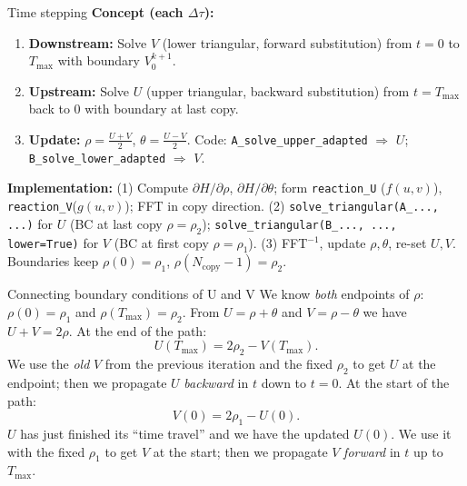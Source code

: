 \documentclass{beamer}
\begin{document}
\begin{frame}{Time stepping}
    \textbf{Concept (each $\Delta\tau$):}
    \begin{enumerate}
        \item \textbf{Downstream:} Solve $V$ (lower triangular, forward substitution) from $t=0$ to $T_{\max}$ with boundary $V_0^{k+1}$.
        \item \textbf{Upstream:} Solve $U$ (upper triangular, backward substitution) from $t=T_{\max}$ back to $0$ with boundary at last copy.
        \item \textbf{Update:} $\rho = \frac{U+V}{2}$, $\theta = \frac{U-V}{2}$. Code: \texttt{A\_solve\_upper\_adapted} $\Rightarrow$ $U$; \texttt{B\_solve\_lower\_adapted} $\Rightarrow$ $V$.
    \end{enumerate}
    \vspace{0.4em}
    \textbf{Implementation:} (1) Compute $\partial H/\partial\rho$, $\partial H/\partial\theta$; form \texttt{reaction\_U} ($f(u,v)$), \texttt{reaction\_V}($g(u,v)$); FFT in copy direction. (2) \texttt{solve\_triangular(A\_..., ...)} for $U$ (BC at last copy $\rho=\rho_2$); \texttt{solve\_triangular(B\_..., ..., lower=True)} for $V$ (BC at first copy $\rho=\rho_1$). (3) FFT$^{-1}$, update $\rho,\theta$, re-set $U,V$. Boundaries keep $\rho(0)=\rho_1$, $\rho(N_{\mathrm{copy}}-1)=\rho_2$.
\end{frame}

\begin{frame}{Connecting boundary conditions of U and V}
    We know \emph{both} endpoints of $\rho$: $\rho(0) = \rho_1$ and $\rho(T_{\max}) = \rho_2$.
    \vspace{0.8em}
    From $U = \rho + \theta$ and $V = \rho - \theta$ we have $U + V = 2\rho$. At the end of the path:
    \begin{equation}
        U(T_{\max}) = 2\rho_2 - V(T_{\max}).
    \end{equation}
    We use the \emph{old} $V$ from the previous iteration and the fixed $\rho_2$ to get $U$ at the endpoint; then we propagate $U$ \emph{backward} in $t$ down to $t=0$.
    \vspace{0.8em}
    At the start of the path:
    \begin{equation}
        V(0) = 2\rho_1 - U(0).
    \end{equation}
    $U$ has just finished its ``time travel'' and we have the updated $U(0)$. We use it with the fixed $\rho_1$ to get $V$ at the start; then we propagate $V$ \emph{forward} in $t$ up to $T_{\max}$.
\end{frame}
\end{document}
